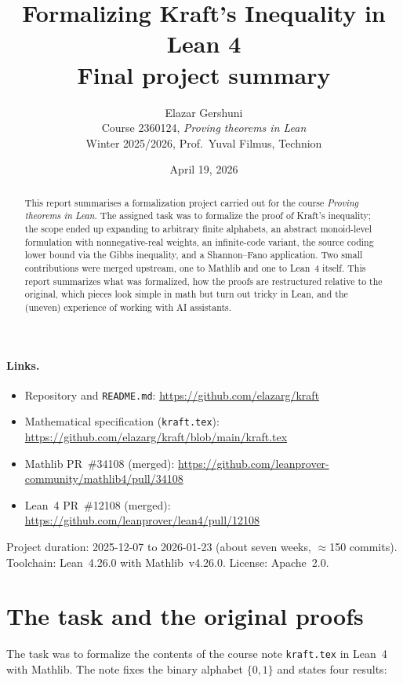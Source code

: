 \documentclass[11pt]{article}
\title{Formalizing Kraft's Inequality in Lean 4\\
  \large Final project summary}
\author{Elazar Gershuni\\
  \small Course 2360124, \emph{Proving theorems in Lean}\\[-2pt]
  \small Winter 2025/2026, Prof.\ Yuval Filmus, Technion}
\date{April 19, 2026}
\begin{document}
\maketitle

\begin{abstract}
\noindent
This report summarises a formalization project carried out for the course
\emph{Proving theorems in Lean}. The assigned task was to formalize the proof of Kraft's inequality; the scope ended up
expanding to arbitrary finite alphabets, an abstract monoid-level
formulation with nonnegative-real weights, an infinite-code variant, the
source coding lower bound via the Gibbs inequality, and a Shannon--Fano
application. Two small contributions were merged upstream, one to
\textsf{Mathlib} and one to \textsf{Lean~4} itself. This report
summarizes what was formalized, how the proofs are restructured relative
to the original, which pieces look simple in math but turn out tricky in
Lean, and the (uneven) experience of working with AI assistants.
\end{abstract}

\paragraph{Links.}
\begin{itemize}[leftmargin=1.5em,itemsep=0pt]
  \item Repository and \texttt{README.md}: \url{https://github.com/elazarg/kraft}
  \item Mathematical specification (\texttt{kraft.tex}):
    \url{https://github.com/elazarg/kraft/blob/main/kraft.tex}
  \item \textsf{Mathlib} PR~\#34108 (merged):
    \url{https://github.com/leanprover-community/mathlib4/pull/34108}
  \item \textsf{Lean~4} PR~\#12108 (merged):
    \url{https://github.com/leanprover/lean4/pull/12108}
\end{itemize}

\medskip\noindent
Project duration: 2025-12-07 to 2026-01-23 (about seven weeks,
$\approx$150 commits). Toolchain: \textsf{Lean~4.26.0} with
\textsf{Mathlib~v4.26.0}. License: Apache~2.0.

\section{The task and the original proofs}

The task was to formalize the contents of the course note \texttt{kraft.tex}
in Lean~4 with \textsf{Mathlib}. The note fixes the binary alphabet
$\{0,1\}$ and states four results:
\end{document}
